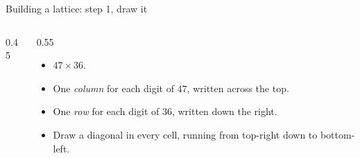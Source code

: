 \documentclass[10pt,aspectratio=169]{beamer}
\newcommand{\lgrid}[2]{%
  \foreach \c in {1,...,#1}{%
    \foreach \r in {1,...,#2}{%
      \draw[cellline] ({\c-1},{-\r+1}) rectangle ({\c},{-\r});
      \draw[diagline] ({\c},{-\r+1}) -- ({\c-1},{-\r});}}%
}
\newcommand{\ltop}[2]{\node[headfont] at ({#1-0.5},{0.32}) {#2};}
\newcommand{\lside}[3]{\node[headfont] at ({#1+0.35},{-#2+0.5}) {#3};}
\begin{document}
\begin{frame}{Building a lattice: step 1, draw it}
  \begin{columns}[c]
    \begin{column}{0.45\textwidth}
      \centering
    \end{column}
    \begin{column}{0.55\textwidth}
      \begin{itemize}
        \item $47 \times 36$.
        \item One \emph{column} for each digit of $47$, written across the top.
        \item One \emph{row} for each digit of $36$, written down the right.
        \item Draw a diagonal in every cell, running from
              {\color{mmblue}top-right down to bottom-left}.
      \end{itemize}
    \end{column}
  \end{columns}
\end{frame}
\end{document}
